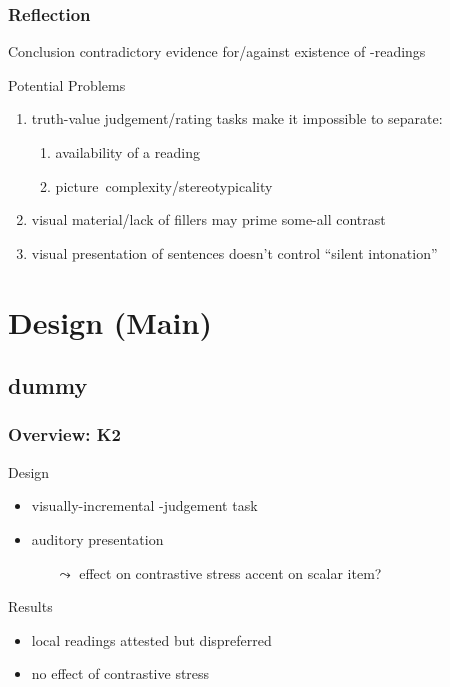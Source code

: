\documentclass[fleqn,10pt,xcolor=dvipsnames]{beamer}
\newcommand{\loc}{\acro{loc}}
\begin{document}
\begin{frame}
  \frametitle{Reflection}
  
  \begin{block}{Conclusion}
    contradictory evidence for/against existence of \loc-readings
  \end{block}
  
  \begin{block}{Potential Problems}
    \begin{enumerate}
    \item truth-value judgement/rating tasks make it impossible to
      separate:
      \begin{enumerate}
      \item availability of a reading
      \item picture~complexity/stereotypicality \hfill
        {}
      \end{enumerate}
    \item visual material/lack of fillers may prime some-all contrast
    \item visual presentation of sentences doesn't control
      ``silent intonation''
    \end{enumerate}
  \end{block}

\end{frame}

\section{Design (Main)}
\subsection{dummy}


\begin{frame}
  \frametitle{Overview: K2}
  \begin{block}{Design}
    \begin{itemize}
    \item visually-incremental -judgement task \hfill {\color{gray}{(new?)}}
    \item auditory presentation
      \begin{itemize}
      \item[$\leadsto$] effect on contrastive stress accent on
      scalar item?
      \end{itemize}
    \end{itemize}
  \end{block}
  \begin{block}{Results}
    \begin{itemize}
    \item local readings attested but dispreferred
    \item no effect of contrastive stress
    \end{itemize}
  \end{block}
\end{frame}
\end{document}
